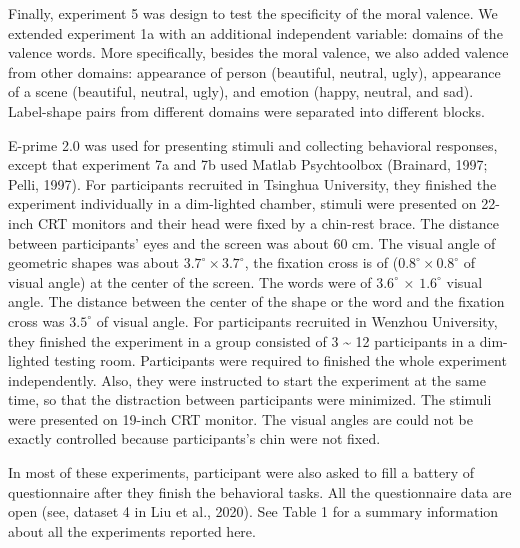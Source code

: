 \documentclass[
  english,
  man]{apa6}
\begin{document}
Finally, experiment 5 was design to test the specificity of the moral valence. We extended experiment 1a with an additional independent variable: domains of the valence words. More specifically, besides the moral valence, we also added valence from other domains: appearance of person (beautiful, neutral, ugly), appearance of a scene (beautiful, neutral, ugly), and emotion (happy, neutral, and sad). Label-shape pairs from different domains were separated into different blocks.

E-prime 2.0 was used for presenting stimuli and collecting behavioral responses, except that experiment 7a and 7b used Matlab Psychtoolbox (Brainard, 1997; Pelli, 1997). For participants recruited in Tsinghua University, they finished the experiment individually in a dim-lighted chamber, stimuli were presented on 22-inch CRT monitors and their head were fixed by a chin-rest brace. The distance between participants' eyes and the screen was about 60 cm. The visual angle of geometric shapes was about \(3.7^\circ × 3.7^\circ\), the fixation cross is of (\(0.8^\circ × 0.8^\circ\) of visual angle) at the center of the screen. The words were of \(3.6^\circ\) × \(1.6^\circ\) visual angle. The distance between the center of the shape or the word and the fixation cross was \(3.5^\circ\) of visual angle. For participants recruited in Wenzhou University, they finished the experiment in a group consisted of 3 \textasciitilde{} 12 participants in a dim-lighted testing room. Participants were required to finished the whole experiment independently. Also, they were instructed to start the experiment at the same time, so that the distraction between participants were minimized. The stimuli were presented on 19-inch CRT monitor. The visual angles are could not be exactly controlled because participants's chin were not fixed.

In most of these experiments, participant were also asked to fill a battery of questionnaire after they finish the behavioral tasks. All the questionnaire data are open (see, dataset 4 in Liu et al., 2020). See Table 1 for a summary information about all the experiments reported here.
\end{document}
